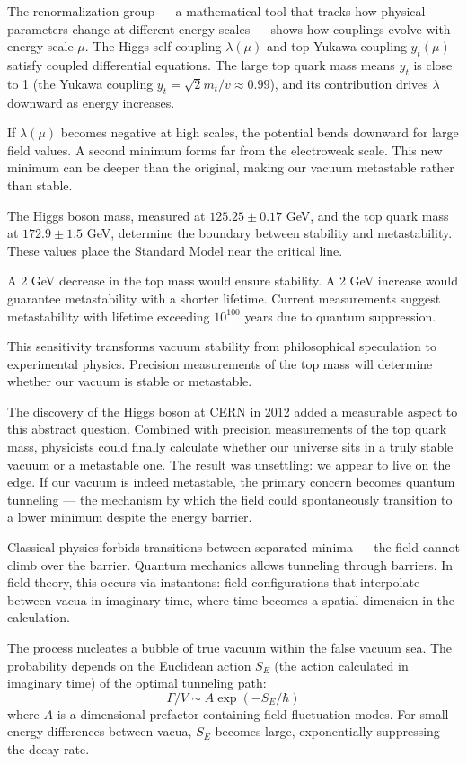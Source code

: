 The renormalization group — a mathematical tool that tracks how physical parameters change at different energy scales — shows how couplings evolve with energy scale $\mu$. The Higgs self-coupling $\lambda(\mu)$ and top Yukawa coupling $y_t(\mu)$ satisfy coupled differential equations. The large top quark mass means $y_t$ is close to 1 (the Yukawa coupling $y_t = \sqrt{2}m_t/v \approx 0.99$), and its contribution drives $\lambda$ downward as energy increases.

If $\lambda(\mu)$ becomes negative at high scales, the potential bends downward for large field values. A second minimum forms far from the electroweak scale. This new minimum can be deeper than the original, making our vacuum metastable rather than stable.

The Higgs boson mass, measured at $125.25 \pm 0.17$ GeV, and the top quark mass at $172.9 \pm 1.5$ GeV, determine the boundary between stability and metastability. These values place the Standard Model near the critical line.

A 2 GeV decrease in the top mass would ensure stability. A 2 GeV increase would guarantee metastability with a shorter lifetime. Current measurements suggest metastability with lifetime exceeding $10^{100}$ years due to quantum suppression.

This sensitivity transforms vacuum stability from philosophical speculation to experimental physics. Precision measurements of the top mass will determine whether our vacuum is stable or metastable.

The discovery of the Higgs boson at CERN in 2012 added a measurable aspect to this abstract question. Combined with precision measurements of the top quark mass, physicists could finally calculate whether our universe sits in a truly stable vacuum or a metastable one. The result was unsettling: we appear to live on the edge. If our vacuum is indeed metastable, the primary concern becomes quantum tunneling — the mechanism by which the field could spontaneously transition to a lower minimum despite the energy barrier.

Classical physics forbids transitions between separated minima — the field cannot climb over the barrier. Quantum mechanics allows tunneling through barriers. In field theory, this occurs via instantons: field configurations that interpolate between vacua in imaginary time, where time becomes a spatial dimension in the calculation.

The process nucleates a bubble of true vacuum within the false vacuum sea. The probability depends on the Euclidean action $S_E$ (the action calculated in imaginary time) of the optimal tunneling path:
\[
\Gamma/V \sim A \exp(-S_E/\hbar)
\]
where $A$ is a dimensional prefactor containing field fluctuation modes. For small energy differences between vacua, $S_E$ becomes large, exponentially suppressing the decay rate.


